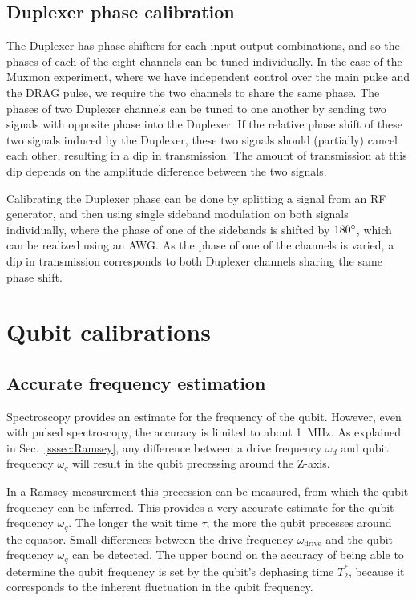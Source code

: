       \subsection{Duplexer phase calibration}
        \label{ssec:Duplexer phase calibration}
        The Duplexer has phase-shifters for each input-output combinations, and so the phases of each of the eight channels can be tuned individually. In the case of the Muxmon experiment, where we have independent control over the main pulse and the DRAG pulse, we require the two channels to share the same phase. The phases of two Duplexer channels can be tuned to one another by sending two signals with opposite phase into the Duplexer. If the relative phase shift of these two signals induced by the Duplexer, these two signals should (partially) cancel each other, resulting in a dip in transmission. The amount of transmission at this dip depends on the amplitude difference between the two signals.

        Calibrating the Duplexer phase can be done by splitting a signal from an RF generator, and then using single sideband modulation on both signals individually, where the phase of one of the sidebands is shifted by $180 \degree$, which can be realized using an AWG. As the phase of one of the channels is varied, a dip in transmission corresponds to both Duplexer channels sharing the same phase shift.

    \section{Qubit calibrations}
      \label{Qubit calibrations}

      \subsection{Accurate frequency estimation}
        \label{ssec:Accurate frequency estimation}
        Spectroscopy provides an estimate for the frequency of the qubit. However, even with pulsed spectroscopy, the accuracy is limited to about \SI{1}{\mega \hertz}. As explained in Sec.~\ref{sssec:Ramsey}, any difference between a drive frequency $\omega_d$ and qubit frequency $\omega_q$ will result in the qubit precessing around the Z-axis.

        In a Ramsey measurement this precession can be measured, from which the qubit frequency can be inferred. This provides a very accurate estimate for the qubit frequency $\omega_q$. The longer the wait time $\tau$, the more the qubit precesses around the equator. Small differences between the drive frequency $\omega_\text{drive}$ and the qubit frequency $\omega_q$ can be detected. The upper bound on the accuracy of being able to determine the qubit frequency is set by the qubit's dephasing time $T_2^*$, because it corresponds to the inherent fluctuation in the qubit frequency.

